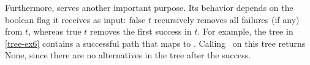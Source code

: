 \documentclass[sigplan,10pt,anonymous,review]{acmart}
\newcommand{\mnone}{\ensuremath{\square}\xspace}
\begin{document}
Furthermore, \na serves another important purpose. Its behavior depends on the
boolean flag it receives as input: \na false $t$ recursively removes
all failures (if any) from $t$, whereas \na true $t$ removes the
first success in $t$. For example, the tree in \cref{tree-ex6} contains a
successful path that maps  to . Calling \na\ on this tree returns
None, since there are no alternatives in the tree after the success.







\end{document}
